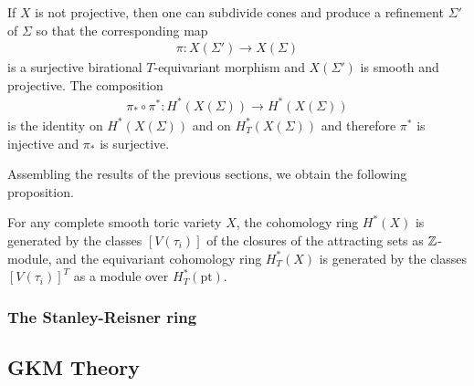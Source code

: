 \hfill

If $X$ is not projective, then one can subdivide cones and produce
a refinement $\Sigma'$ of $\Sigma$ so that the corresponding map \begin{align*}
	\pi: X(\Sigma') \to X(\Sigma)
\end{align*} is a surjective birational $T$-equivariant morphism and
$X(\Sigma')$ is smooth and projective. The composition \begin{align*}
	\pi_*\circ \pi^*: H^*(X(\Sigma)) \to H^*(X(\Sigma))
\end{align*} is the identity on $H^*(X(\Sigma))$ and on $H^*_T(X(\Sigma))$
and therefore $\pi^*$ is injective and $\pi_*$ is surjective.

Assembling the results of the previous sections, we obtain the following proposition.

\begin{proposition}
	For any complete smooth toric variety $X$, the cohomology ring $H^*(X)$
	is generated by the classes $[V(\tau_i)]$ of the closures of the attracting sets
	as $\mathbb{Z}$-module, and the equivariant cohomology ring $H^*_T(X)$ is generated
	by the classes $[V(\tau_i)]^T$ as a module over $H^*_T(\text{pt})$.
\end{proposition}

\subsubsection{The Stanley-Reisner ring}

\subsection{GKM Theory}
